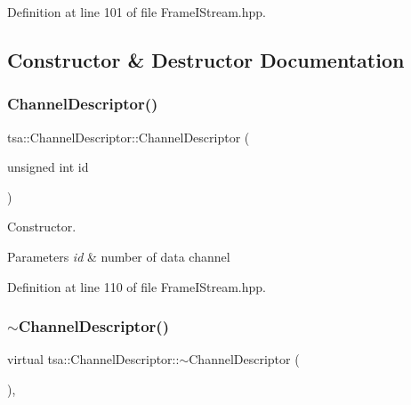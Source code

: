 Definition at line 101 of file Frame\+I\+Stream.\+hpp.



\subsection{Constructor \& Destructor Documentation}
\mbox{\label{classtsa_1_1_channel_descriptor_a320624e156e5d856077465474bc7154f}} 
\subsubsection{\texorpdfstring{Channel\+Descriptor()}{ChannelDescriptor()}}
{\footnotesize\ttfamily tsa\+::\+Channel\+Descriptor\+::\+Channel\+Descriptor (\begin{DoxyParamCaption}\item[{unsigned int}]{id }\end{DoxyParamCaption})\hspace{0.3cm}{\ttfamily [inline]}}

Constructor.


\begin{DoxyParams}{Parameters}
{\em id} & number of data channel \\
\hline
\end{DoxyParams}


Definition at line 110 of file Frame\+I\+Stream.\+hpp.

\mbox{\label{classtsa_1_1_channel_descriptor_a2b4f201421dcd2cc9d2c1705fe4bea61}} 
\subsubsection{\texorpdfstring{$\sim$\+Channel\+Descriptor()}{~ChannelDescriptor()}}
{\footnotesize\ttfamily virtual tsa\+::\+Channel\+Descriptor\+::$\sim$\+Channel\+Descriptor (\begin{DoxyParamCaption}{ }\end{DoxyParamCaption})\hspace{0.3cm}{\ttfamily [inline]}, {\ttfamily [virtual]}}

